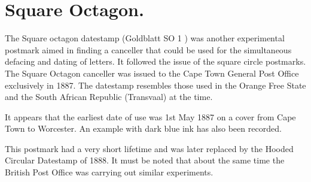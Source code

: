 \section{Square Octagon.}





The Square octagon datestamp  (Goldblatt SO  1 ) was another 
experimental postmark aimed in finding a canceller that could 
be used for the simultaneous defacing and dating of letters. 
It followed the issue of the square circle postmarks. The Square 
Octagon canceller was issued to the Cape Town General Post 
Office exclusively in 1887. The datestamp resembles those 
used in the Orange Free State and the South African Republic
(Transvaal) at the time.

It appears that the earliest date of use was 1st May 1887 
on a cover from Cape Town to Worcester. An example with dark 
blue ink has also been recorded. 

This postmark  had a very short lifetime and was later 
replaced by the Hooded Circular Datestamp of 1888. It must be 
noted that about the same time the British Post Office was 
carrying out similar experiments.

                                         